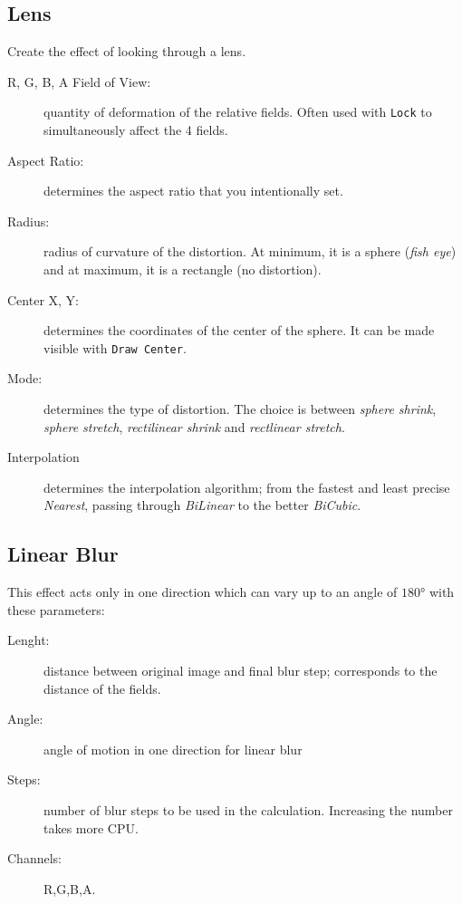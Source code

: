 \subsection{Lens}%
\label{sub:lens}

Create the effect of looking through a lens.

\begin{description}
    \item[R, G, B, A Field of View:] quantity of deformation of the relative fields. Often used with \texttt{Lock} to simultaneously affect the 4 fields.
    \item[Aspect Ratio:] determines the aspect ratio that you intentionally set.
    \item[Radius:] radius of curvature of the distortion. At minimum, it is a sphere (\textit{fish eye}) and at maximum, it is a rectangle (no distortion).
    \item[Center X, Y:] determines the coordinates of the center of the sphere. It can be made visible with \texttt{Draw Center}.
    \item[Mode:] determines the type of distortion. The choice is between \textit{sphere shrink}, \textit{sphere stretch}, \textit{rectilinear shrink} and \textit{rectlinear stretch}.
    \item[Interpolation] determines the interpolation algorithm; from the fastest and least precise \textit{Nearest}, passing through \textit{BiLinear} to the better \textit{BiCubic}.
\end{description}

\subsection{Linear Blur}%
\label{sub:linear_blur}

This effect acts only in one direction which can vary up to an angle of $180°$ with these parameters:

\begin{description}
    \item[Lenght:] distance between original image and final blur step; corresponds to the distance of the fields.
    \item[Angle:] angle of motion in one direction for linear blur
    \item[Steps:] number of blur steps to be used in the calculation. Increasing the number takes more CPU.
    \item[Channels:] R,G,B,A.
\end{description}

